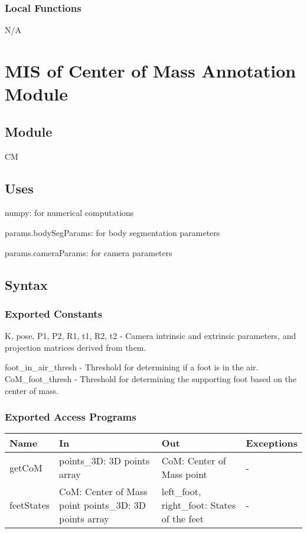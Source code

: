 \documentclass[12pt, titlepage]{article}
\begin{document}
\subsubsection{Local Functions}
N/A

\section{MIS of Center of Mass Annotation Module} \label{sec:centerofmass}

\subsection{Module}
CM

\subsection{Uses}

\noindent numpy: for numerical computations

\noindent params.bodySegParams: for body segmentation parameters

\noindent params.cameraParams: for camera parameters

\subsection{Syntax}

\subsubsection{Exported Constants}

\noindent K, pose, P1, P2, R1, t1, R2, t2 - Camera intrinsic and extrinsic parameters, and
projection matrices derived from them.

\noindent foot\_in\_air\_thresh - Threshold for determining if a foot is in the air.
\noindent CoM\_foot\_thresh - Threshold for determining the supporting foot based on the center of mass.

\subsubsection{Exported Access Programs}
\begin{tabularx}{\textwidth}{X X X X}
  \hline
  \textbf{Name}    & \textbf{In}                                                 & \textbf{Out}                                      & \textbf{Exceptions} \\
  \hline
  getCoM     & points\_3D: 3D points array                           & CoM: Center of Mass point                   & -             \\
  feetStates & CoM: Center of Mass point points\_3D: 3D points array & left\_foot, right\_foot: States of the feet & -             \\
  \hline
\end{tabularx}
\end{document}
